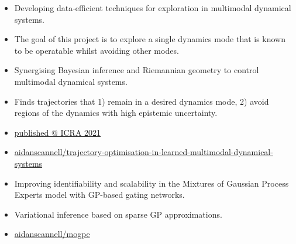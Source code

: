 \documentclass[10pt,a4paper,ragged2e,withhyper]{altacv}
\begin{document}
\begin{paracol}{2}
\begin{itemize}
\item Developing data-efficient techniques for exploration in multimodal dynamical systems.
\item The goal of this project is to explore a single dynamics mode that is known to be operatable whilst avoiding other modes.
\end{itemize}

\divider


\begin{itemize}
\item Synergising Bayesian inference and Riemannian geometry to control multimodal dynamical systems.
\item Finds trajectories that 1) remain in a desired dynamics mode, 2) avoid regions of the dynamics with high epistemic uncertainty.
\item \href{https://www.aidanscannell.com/publication/trajectory-optimisation-in-learned-multimodal-dynamical-systems-via-latent-ode-collocation/paper.pdf}{\faBook published @ ICRA 2021}
\item \href{https://github.com/aidanscannell/trajectory-optimisation-in-learned-multimodal-dynamical-systems}{\faGithub aidanscannell/trajectory-optimisation-in-learned-multimodal-dynamical-systems}
\end{itemize}

\par\divider


\begin{itemize}
\item Improving identifiability and scalability in the Mixtures of Gaussian Process Experts model with GP-based gating networks.
\item Variational inference based on sparse GP approximations.
\item \href{https://github.com/aidanscannell/mogpe}{\faGithub aidanscannell/mogpe}
\end{itemize}



\end{paracol}
\end{document}
